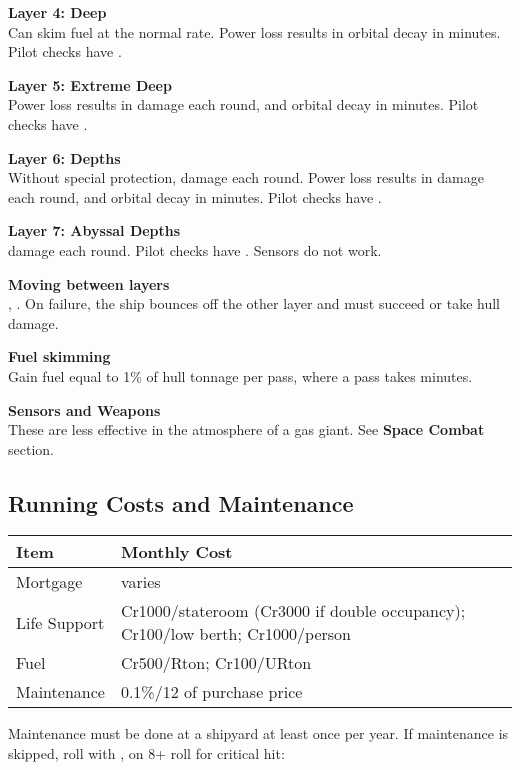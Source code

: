 \documentclass{cheatsheet}
\begin{document}
\begin{multicols}{3}
\textbf{Layer 4: Deep}\\
Can skim fuel at the normal rate.  Power loss results in orbital decay
in  minutes.  Pilot checks have .

\textbf{Layer 5: Extreme Deep}\\
Power loss results in  damage each round, and orbital decay
in  minutes.  Pilot checks have .

\textbf{Layer 6: Depths}\\
Without special protection,  damage each round.  Power loss
results in  damage each round, and orbital decay in 
minutes.  Pilot checks have .

\textbf{Layer 7: Abyssal Depths}\\
 damage each round.  Pilot checks have .  Sensors
do not work.

\textbf{Moving between layers}\\
, .  On
failure, the ship bounces off the other layer and must succeed
 or take 
hull damage.

\textbf{Fuel skimming}\\
Gain fuel equal to 1\% of hull tonnage per pass, where a pass takes
 minutes.

\textbf{Sensors and Weapons}\\
These are less effective in the atmosphere of a gas giant.  See
\textbf{Space Combat} section.

\subsection{Running Costs and Maintenance}

\begin{tabularx}{\linewidth}{lX} \toprule
  Item & Monthly Cost \\ \midrule
  Mortgage & varies \\
  Life Support & Cr1000/stateroom (Cr3000 if double occupancy); Cr100/low berth; Cr1000/person \\
  Fuel & Cr500/Rton; Cr100/URton \\
  Maintenance & 0.1\%/12 of purchase price \\ \bottomrule
\end{tabularx}

Maintenance must be done at a shipyard at least once per year.  If
maintenance is skipped, roll with , on 8+ roll for
critical hit:


\end{multicols}
\end{document}
